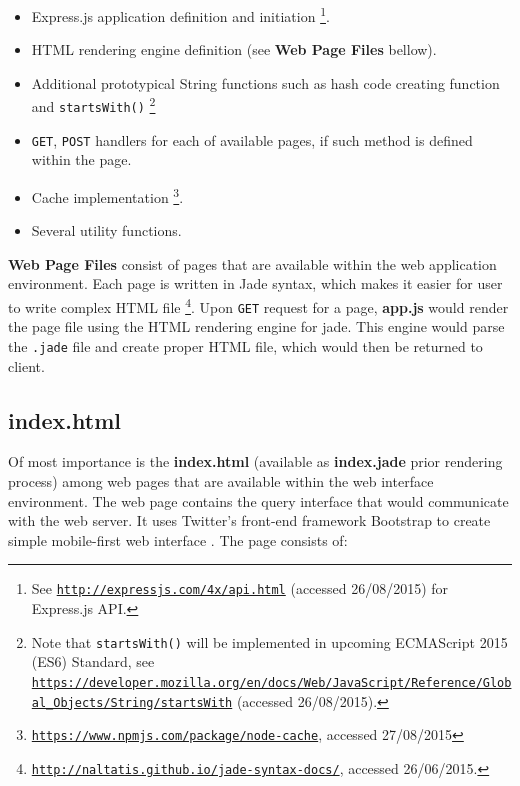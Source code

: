 \begin{itemize}
\item Express.js application definition and initiation \footnote{See \href{http://expressjs.com/4x/api.html}{\texttt{http://expressjs.com/4x/api.html}} (accessed 26/08/2015) for Express.js API.}.
\item HTML rendering engine definition (see \textbf{Web Page Files} bellow).
\item Additional prototypical String functions such as hash code creating function  and \texttt{startsWith()} \footnote{Note that \texttt{startsWith()} will be implemented in upcoming ECMAScript 2015 (ES6) Standard, see \href{https://developer.mozilla.org/en/docs/Web/JavaScript/Reference/Global_Objects/String/startsWith}{\texttt{https://developer.mozilla.org/en/docs/Web/JavaScript/Reference/Global\_Objects/String/startsWith}} (accessed 26/08/2015).}
\item \texttt{GET}, \texttt{POST} handlers for each of available pages, if such method is defined within the page.
\item Cache implementation \footnote{\href{https://www.npmjs.com/package/node-cache}{\texttt{https://www.npmjs.com/package/node-cache}}, accessed 27/08/2015}.
\item Several utility functions.
\end{itemize}

\textbf{Web Page Files} consist of pages that are available within the web application environment. Each page is written in Jade syntax, which makes it easier for user to write complex HTML file \footnote{\href{http://naltatis.github.io/jade-syntax-docs/}{\texttt{http://naltatis.github.io/jade-syntax-docs/}}, accessed 26/06/2015.}. Upon \texttt{GET} request for a page, \textbf{app.js} would render the page file using the HTML rendering engine for jade. This engine would parse the \texttt{.jade} file and create proper HTML file, which would then be returned to client.

\subsection{index.html}

Of most importance is the \textbf{index.html} (available as \textbf{index.jade} prior rendering process) among web pages that are available within the web interface environment. The web page contains the query interface that would communicate with the web server. It uses Twitter's front-end framework Bootstrap to create simple mobile-first web interface \citep{bootstrapjs}. The page consists of:

